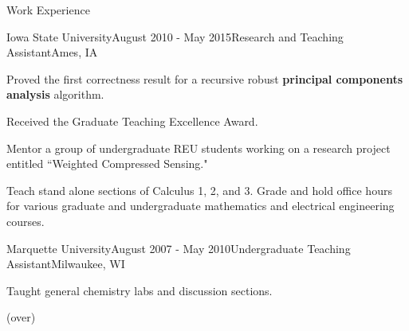 \documentclass{resume} %
\begin{document}
\begin{rSection}{Work Experience}

\begin{rSubsection}{Iowa State University}{August 2010 - May 2015}{Research and Teaching Assistant}{Ames, IA}
\item Proved the first correctness result for a recursive robust {\bf principal components analysis} algorithm.  
\item Received the Graduate Teaching Excellence Award.
\item Mentor a group of undergraduate REU students working on a research project entitled ``Weighted Compressed Sensing."
\item Teach stand alone sections of Calculus 1, 2, and 3. 
Grade and hold office hours for various graduate and undergraduate mathematics and electrical engineering courses. 
\end{rSubsection}

\begin{rSubsection}{Marquette University}{August 2007 - May 2010}{Undergraduate Teaching Assistant}{Milwaukee, WI}
\item Taught general chemistry labs and discussion sections.
\end{rSubsection}

\end{rSection}



\vfill
\begin{center}
	(over)
\end{center}
\newpage


%	
%
	
\end{document}
